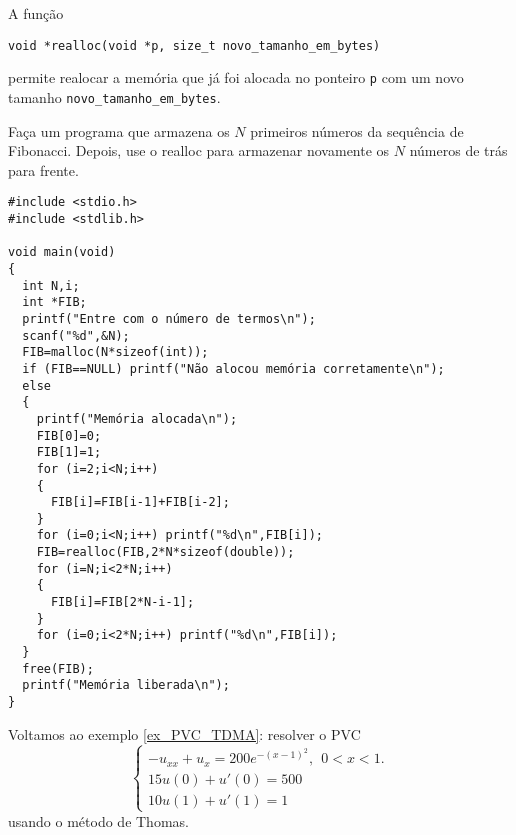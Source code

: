 A função
\begin{verbatim}
void *realloc(void *p, size_t novo_tamanho_em_bytes)
\end{verbatim}
permite realocar a memória que já foi alocada no ponteiro \verb|p| com um novo tamanho \verb|novo_tamanho_em_bytes|.
\begin{ex}
Faça um programa que armazena os $N$ primeiros números da sequência de Fibonacci. Depois, use o realloc para armazenar novamente os $N$ números de trás para frente.
\end{ex}
\begin{verbatim}
#include <stdio.h>
#include <stdlib.h>

void main(void)
{
  int N,i;
  int *FIB;
  printf("Entre com o número de termos\n");
  scanf("%d",&N);
  FIB=malloc(N*sizeof(int));
  if (FIB==NULL) printf("Não alocou memória corretamente\n");
  else
  {
    printf("Memória alocada\n");
    FIB[0]=0;
    FIB[1]=1;
    for (i=2;i<N;i++)
    {
      FIB[i]=FIB[i-1]+FIB[i-2];
    }
    for (i=0;i<N;i++) printf("%d\n",FIB[i]);
    FIB=realloc(FIB,2*N*sizeof(double));
    for (i=N;i<2*N;i++)
    {
      FIB[i]=FIB[2*N-i-1];
    }
    for (i=0;i<2*N;i++) printf("%d\n",FIB[i]);
  }
  free(FIB);
  printf("Memória liberada\n");
}
\end{verbatim}
\begin{ex}
Voltamos ao exemplo \ref{ex_PVC_TDMA}: resolver o PVC
$$\left\{\begin{array}{l}-u_{xx}+u_x=200e^{-(x-1)^2},~~ 0<x<1.\\
15u(0)+u'(0)=500\\
10u(1)+u'(1)=1\end{array}
\right.
$$
usando o método de Thomas.
\end{ex}
